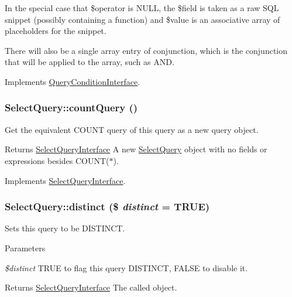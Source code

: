 In the special case that \$operator is NULL, the \$field is taken as a raw SQL snippet (possibly containing a function) and \$value is an associative array of placeholders for the snippet.

There will also be a single array entry of conjunction, which is the conjunction that will be applied to the array, such as AND. 

Implements \hyperlink{interfaceQueryConditionInterface_a894cc290ed61feb3693b1d459ae86888}{QueryConditionInterface}.\hypertarget{classSelectQuery_a7d2e665bede18c709f677033e04db55e}{
\subsubsection[{countQuery}]{\setlength{\rightskip}{0pt plus 5cm}SelectQuery::countQuery ()}}
\label{classSelectQuery_a7d2e665bede18c709f677033e04db55e}
Get the equivalent COUNT query of this query as a new query object.

\begin{DoxyReturn}{Returns}
\hyperlink{interfaceSelectQueryInterface}{SelectQueryInterface} A new \hyperlink{classSelectQuery}{SelectQuery} object with no fields or expressions besides COUNT($\ast$). 
\end{DoxyReturn}


Implements \hyperlink{interfaceSelectQueryInterface_a48fd44b77e75771af6d3f289502f050e}{SelectQueryInterface}.\hypertarget{classSelectQuery_a9d76d503d9769768f5d20cf1793c670b}{
\subsubsection[{distinct}]{\setlength{\rightskip}{0pt plus 5cm}SelectQuery::distinct (\$ {\em distinct} = {\ttfamily TRUE})}}
\label{classSelectQuery_a9d76d503d9769768f5d20cf1793c670b}
Sets this query to be DISTINCT.


\begin{DoxyParams}{Parameters}
\item[{\em \$distinct}]TRUE to flag this query DISTINCT, FALSE to disable it. \end{DoxyParams}
\begin{DoxyReturn}{Returns}
\hyperlink{interfaceSelectQueryInterface}{SelectQueryInterface} The called object. 
\end{DoxyReturn}



